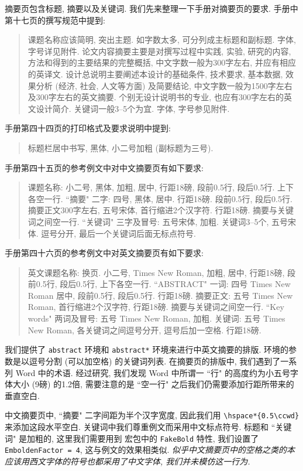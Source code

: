 摘要页包含标题, 摘要以及关键词. 我们先来整理一下手册对摘要页的要求. 手册中第十七页的撰写规范中提到:
\begin{quote}
  课题名称应该简明, 突出主题. 如字数太多, 可分列成主标题和副标题. 字体, 字号详见附件.
  论文内容摘要主要是对撰写过程中实践, 实验, 研究的内容, 方法和得到的主要结果的完整概括, 中文字数一般为300字左右, 并应有相应的英译文.
  设计总说明主要阐述本设计的基础条件, 技术要求, 基本数据, 效果分析 (经济, 社会, 人文等方面) 及简要结论, 中文字数一般为1500字左右及300字左右的英文摘要. 个别无设计说明书的专业, 也应有300字左右的英文设计简介.
  关键词一般3--5个为宜. 字体, 字号参见附件.
\end{quote}
手册第四十四页的打印格式及要求说明中提到:
\begin{quote}
  标题栏居中书写, 黑体, 小二号加粗 (副标题为三号).
\end{quote}
手册第四十五页的参考例文中对中文摘要页有如下要求:
\begin{quote}
  课题名称: 小二号, 黑体, 加粗, 居中, 行距18磅, 段前0.5行, 段后0.5行. 上下各空一行.
  ``摘要" 二字: 四号, 黑体, 居中. 行距18磅. 段前0.5行, 段后0.5行.
  摘要正文300字左右, 五号宋体, 首行缩进2个汉字符. 行距18磅.
  摘要与关键词之间空一行.
  ``关键词" 三字及冒号: 五号宋体, 加粗.
  关键词3--5个, 五号宋体. 逗号分开, 最后一个关键词后面无标点符号.
\end{quote}
手册第四十六页的参考例文中对英文摘要页有如下要求:
\begin{quote}
  英文课题名称: 换页. 小二号, Times New Roman, 加粗, 居中, 行距18磅, 段前0.5行, 段后0.5行, 上下各空一行.
  ``ABSTRACT" 一词: 四号 Times New Roman 居中, 段前0.5行, 段后0.5行. 行距18磅.
  摘要正文: 五号 Times New Roman, 首行缩进2个汉字符, 行距18磅.
  摘要与关键词之间空一行.
  ``Key words" 两词及冒号: 五号 Times New Roman, 加粗.
  关键词: 五号 Times New Roman, 各关键词之间逗号分开, 逗号后加一空格. 行距18磅.
\end{quote}

我们提供了 \verb|abstract| 环境和 \verb|abstract*| 环境来进行中英文摘要的排版. 环境的参数是以逗号分割 (可以加空格) 的关键词列表. 在摘要页的排版中, 我们遇到了一系列 Word 中的术语. 经过研究, 我们发现 Word 中所谓一 ``行" 的高度约为小五号字体大小 (9磅) 的1.2倍, 需要注意的是 ``空一行" 之后我们仍需要添加行距所带来的垂直空白.

中文摘要页中, ``摘要" 二字间距为半个汉字宽度, 因此我们用 \verb|\hspace*{0.5\ccwd}| 来添加这段水平空白. 关键词中我们尊重例文而采用中文标点符号. 标题和 ``关键词" 是加粗的, 这里我们需要用到  宏包中的 \verb|FakeBold| 特性, 我们设置了 \verb|EmboldenFactor = 4|, 这与例文的效果相类似. \emph{似乎中文摘要页中的空格之类的本应该用西文字体的符号也都采用了中文字体, 我们并未模仿这一行为.}

